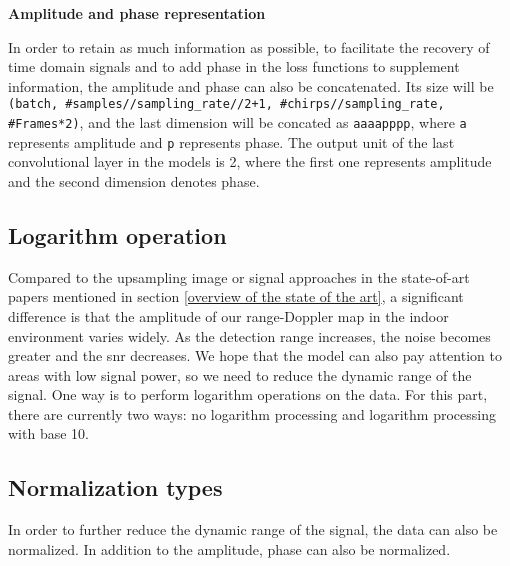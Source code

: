 \begin{spacing}{1.5}
\textbf{\large{Amplitude and phase representation}}
\end{spacing}

In order to retain as much information as possible, to facilitate the recovery of time domain signals and to add phase in the loss functions to supplement information, the amplitude and phase can also be concatenated. Its size will be \texttt{(batch, \#samples//sampling\_rate//2+1, \#chirps//sampling\_rate, \#Frames*2)}, and the last dimension will be concated as \texttt{aaaapppp}, where \texttt{a} represents amplitude and \texttt{p} represents phase. The output unit of the last convolutional layer in the models is 2, where the first one represents amplitude and the second dimension denotes phase.

\subsection{Logarithm operation} \label{logarithm operation}
Compared to the upsampling image or signal approaches in the state-of-art papers mentioned in section \ref{overview of the state of the art}, a significant difference is that the amplitude of our range-Doppler map in the indoor environment varies widely. As the detection range increases, the noise becomes greater and the \gls{snr} decreases. We hope that the model can also pay attention to areas with low signal power, so we need to reduce the dynamic range of the signal. One way is to perform logarithm operations on the data. For this part, there are currently two ways: no logarithm processing and logarithm processing with base 10.

\subsection{Normalization types} \label{normalization types}
In order to further reduce the dynamic range of the signal, the data can also be normalized. In addition to the amplitude, phase can also be normalized.


